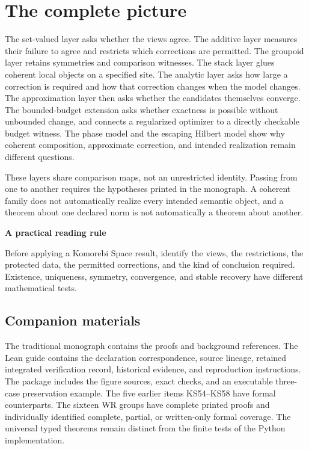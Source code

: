 \documentclass[11pt]{article}
\begin{document}
\clearpage\section*{The complete picture}
The set-valued layer asks whether the views agree. The additive layer measures their failure to agree and restricts which corrections are permitted. The groupoid layer retains symmetries and comparison witnesses. The stack layer glues coherent local objects on a specified site. The analytic layer asks how large a correction is required and how that correction changes when the model changes. The approximation layer then asks whether the candidates themselves converge. The bounded-budget extension asks whether exactness is possible without unbounded change, and connects a regularized optimizer to a directly checkable budget witness. The phase model and the escaping Hilbert model show why coherent composition, approximate correction, and intended realization remain different questions.

These layers share comparison maps, not an unrestricted identity. Passing from one to another requires the hypotheses printed in the monograph. A coherent family does not automatically realize every intended semantic object, and a theorem about one declared norm is not automatically a theorem about another.

\begin{insight}
\textbf{A practical reading rule}\par
Before applying a Komorebi Space result, identify the views, the restrictions, the protected data, the permitted corrections, and the kind of conclusion required. Existence, uniqueness, symmetry, convergence, and stable recovery have different mathematical tests.
\end{insight}

\subsection*{Companion materials}
The traditional monograph contains the proofs and background references. The Lean guide contains the declaration correspondence, source lineage, retained integrated verification record, historical evidence, and reproduction instructions. The package includes the figure sources, exact checks, and an executable three-case preservation example. The five earlier items KS54--KS58 have formal counterparts. The sixteen WR groups have complete printed proofs and individually identified complete, partial, or written-only formal coverage. The universal typed theorems remain distinct from the finite tests of the Python implementation.
\end{document}
